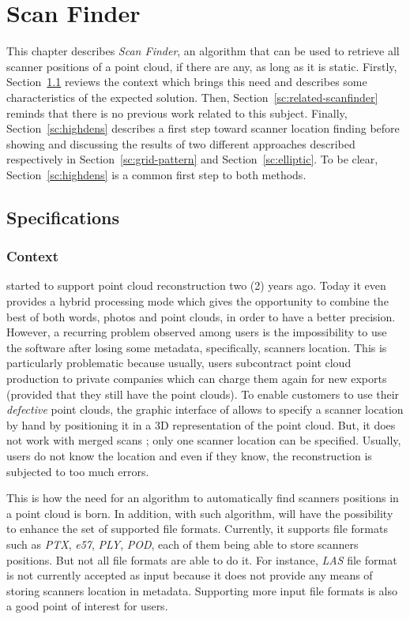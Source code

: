 \chapter{Scan Finder}
\label{ch:scanfinder}
This chapter describes \emph{Scan Finder}, an algorithm that can be used to retrieve all scanner positions of a point cloud,  if there are any, as long as it is static. Firstly, Section~\ref{sc:spec-scanfinder} reviews the context which brings this need and describes some characteristics of the expected solution. Then, Section~\ref{sc:related-scanfinder} reminds that there is no previous work related to this subject. Finally, Section~\ref{sc:highdens} describes a first step toward scanner location
finding before showing and discussing the results of two different approaches described respectively in Section~\ref{sc:grid-pattern} and Section~\ref{sc:elliptic}. To be clear, Section~\ref{sc:highdens} is a common first step to both methods.

\section{Specifications}
\label{sc:spec-scanfinder}
\subsection{Context}
\CC started to support point cloud reconstruction two (2) years ago. Today it even provides a hybrid processing mode which gives the opportunity to combine the best of both words, photos and point clouds, in order to have a better precision. However, a recurring problem observed among \CC users is the impossibility to use the software after losing some metadata, specifically, scanners location. This is particularly problematic because usually, \CC users subcontract point cloud production to private companies which can charge them again for new exports (provided that they still have the point clouds). To enable customers to use their \emph{defective} point clouds, the graphic interface of \CC allows to specify a scanner location by hand by positioning it in a 3D representation of the point cloud. But, it does not work with merged scans ; only one scanner location can be specified. Usually, users do not know the location and even if they know, the reconstruction is subjected to too much errors.

This is how the need for an algorithm to automatically find scanners positions in a point cloud is born. In addition, with such algorithm, \CC will have the possibility to enhance the set of supported file formats. Currently, it supports file formats such as \emph{PTX}, \emph{e57}, \emph{PLY}, \emph{POD}, each of them being able to store scanners positions. But not all file formats are able to do it. For instance, \emph{LAS} file format is not currently accepted as input because it does not provide any means of storing scanners location in metadata. Supporting more input file formats is also a good point of interest for \CC users.

